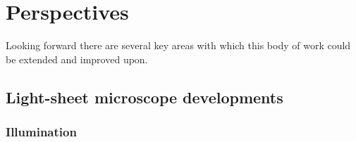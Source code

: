 
\chapter{Perspectives}\label{chapter:perspectives}

Looking forward there are several key areas with which this body of work could be extended and improved upon.

\section{Light-sheet microscope developments}
\subsection{Illumination}


